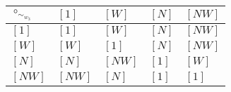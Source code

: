 \begin{tabularx}{0.6\textwidth}{l|llll}
$\circ_{\sim_{w_{3}}}$ & $[1]$ & $[W]$ & $[N]$ & $[NW]$ \\
\hline
$[1]$ & $[1]$ & $[W]$ & $[N]$ & $[NW]$ \\
$[W]$ & $[W]$ & $[1]$ & $[N]$ & $[NW]$ \\
$[N]$ & $[N]$ & $[NW]$ & $[1]$ & $[W]$ \\
$[NW]$ & $[NW]$ & $[N]$ & $[1]$ & $[1]$ \\
\end{tabularx}
